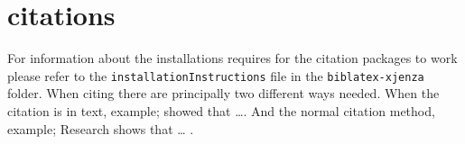 \section{citations}

For information about the installations requires for the citation packages to work please refer to the \texttt{installationInstructions} file in the \texttt{biblatex-xjenza} folder. When citing there are principally two different ways needed. When the citation is in text, example; \textcite{TestKey} showed that \dots{}. And the normal citation method, example; Research shows that \dots{} \cite{TestKey}.

\printbibliography

